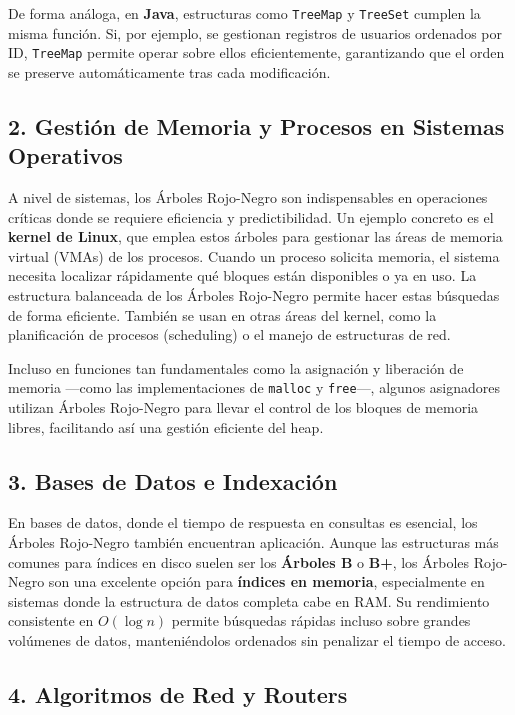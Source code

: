 \documentclass[conference]{IEEEtran}
\begin{document}
De forma análoga, en \textbf{Java}, estructuras como \texttt{TreeMap} y \texttt{TreeSet} cumplen la misma función. Si, por ejemplo, se gestionan registros de usuarios ordenados por ID, \texttt{TreeMap} permite operar sobre ellos eficientemente, garantizando que el orden se preserve automáticamente tras cada modificación.

\subsection*{2. Gestión de Memoria y Procesos en Sistemas Operativos}

A nivel de sistemas, los Árboles Rojo-Negro son indispensables en operaciones críticas donde se requiere eficiencia y predictibilidad.  
Un ejemplo concreto es el \textbf{kernel de Linux}, que emplea estos árboles para gestionar las áreas de memoria virtual (VMAs) de los procesos. Cuando un proceso solicita memoria, el sistema necesita localizar rápidamente qué bloques están disponibles o ya en uso. La estructura balanceada de los Árboles Rojo-Negro permite hacer estas búsquedas de forma eficiente. También se usan en otras áreas del kernel, como la planificación de procesos (scheduling) o el manejo de estructuras de red.

Incluso en funciones tan fundamentales como la asignación y liberación de memoria —como las implementaciones de \texttt{malloc} y \texttt{free}—, algunos asignadores utilizan Árboles Rojo-Negro para llevar el control de los bloques de memoria libres, facilitando así una gestión eficiente del heap.

\subsection*{3. Bases de Datos e Indexación}

En bases de datos, donde el tiempo de respuesta en consultas es esencial, los Árboles Rojo-Negro también encuentran aplicación.  
Aunque las estructuras más comunes para índices en disco suelen ser los \textbf{Árboles B} o \textbf{B+}, los Árboles Rojo-Negro son una excelente opción para \textbf{índices en memoria}, especialmente en sistemas donde la estructura de datos completa cabe en RAM. Su rendimiento consistente en \(O(\log n)\) permite búsquedas rápidas incluso sobre grandes volúmenes de datos, manteniéndolos ordenados sin penalizar el tiempo de acceso.

\subsection*{4. Algoritmos de Red y Routers}
\end{document}
